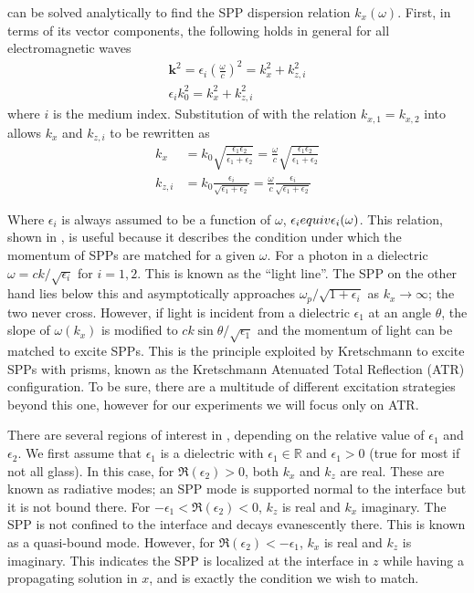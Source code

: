  can be solved analytically to find the SPP
dispersion relation $k_x(\omega)$.
First, in terms of its vector components, the following holds in general
for all electromagnetic waves
\begin{align}
\mathbf{k}^2=\epsilon_i \left(\frac{\omega}{c}\right)^2=k_x^2 + k_{z,i}^2\\
\epsilon_i k_0^2=k_x^2 + k_{z,i}^2
\label{eqn:dispersion1}
\end{align}
where $i$ is the medium index.
Substitution of  with the relation 
$k_{x,1}=k_{x,2}$ into  allows 
$k_x$ and $k_{z,i}$ to be rewritten as
\begin{align}
k_x &= k_0\sqrt{\frac{\epsilon_1 \epsilon_2}{\epsilon_1+\epsilon_2}} 
= \frac{\omega}{c}\sqrt{\frac{\epsilon_1 \epsilon_2}{\epsilon_1+\epsilon_2}}\\
k_{z,i} &= k_0\frac{\epsilon_i}{\sqrt{\epsilon_1+\epsilon_2}}
= \frac{\omega}{c}\frac{\epsilon_i}{\sqrt{\epsilon_1+\epsilon_2}}
\end{align}

Where $\epsilon_i$ is always assumed to be a function of $\omega$, 
$\epsilon_i\\equiv\epsilon_i(\omega)$.  This relation, shown in
, is useful because it describes the
condition under which the momentum of SPPs are matched for a given
$\omega$.  For a photon in a dielectric $\omega = c k /\sqrt{\epsilon_i}$
for $i=1,2$.  This is known as the ``light line''.  The SPP on the other
hand lies below this and asymptotically approaches
$\omega_p/\sqrt{1+\epsilon_i}$ as $k_x\to\infty$; the two never cross.
However, if light is incident from a dielectric $\epsilon_1$ at an angle
$\theta$, the slope of $\omega(k_x)$ is modified to $c k \sin
\theta/\sqrt{\epsilon_1}$ and the momentum of light can be matched to
excite SPPs.  This is the principle exploited by Kretschmann
\cite{kretschmann1968} to excite SPPs with prisms, known as the
Kretschmann Atenuated Total Reflection (ATR) configuration.  To be sure,
there are a multitude of different excitation strategies beyond this one,
however for our experiments we will focus only on ATR.

There are several regions of interest in ,
depending on the relative value of $\epsilon_1$ and $\epsilon_2$.  We first
assume that $\epsilon_1$ is a dielectric with $\epsilon_1\in\mathbb{R}$ and
$\epsilon_1 > 0$ (true for most if not all glass).  In this case, for
$\Re(\epsilon_2)>0$, both $k_x$ and $k_z$ are real.  These are known as
radiative modes; an SPP mode is supported normal to the interface but
it is not bound there.  For $-\epsilon_1<\Re(\epsilon_2)<0$, $k_z$ is real
and $k_x$ imaginary.  The SPP is not confined to the interface and decays
evanescently there. This is known as a quasi-bound mode.  However, for
$\Re(\epsilon_2)<-\epsilon_1$, $k_x$ is real and $k_z$ is imaginary.  This
indicates the SPP is localized at the interface in $z$ while having a
propagating solution in $x$, and is exactly the condition we wish to match.

